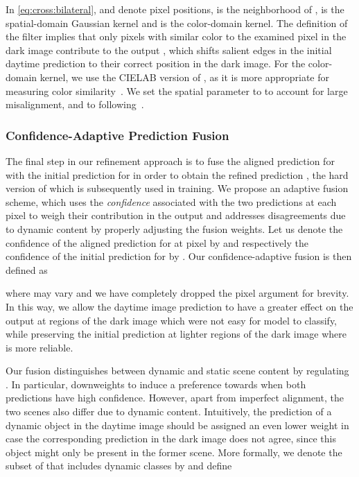 \documentclass[10pt,twocolumn,letterpaper]{article}
\begin{document}
In \eqref{eq:cross:bilateral},  and  denote pixel positions,  is the neighborhood of ,  is the spatial-domain Gaussian kernel and  is the color-domain kernel. The definition of the filter implies that only pixels  with similar color to the examined pixel  in the dark image  contribute to the output , which shifts salient edges in the initial daytime prediction to their correct position in the dark image. For the color-domain kernel, we use the CIELAB version of , as it is more appropriate for measuring color similarity~\cite{bilateral:grid}. We set the spatial parameter  to  to account for large misalignment, and  to  following~\cite{bilateral:grid,SynRealDataFogECCV18}.

\subsubsection{Confidence-Adaptive Prediction Fusion}
\label{sec:gcma:guidance:fusion}

The final step in our refinement approach is to fuse the aligned prediction  for  with the initial prediction  for  in order to obtain the refined prediction , the hard version of which is subsequently used in training. We propose an adaptive fusion scheme, which uses the \emph{confidence} associated with the two predictions at each pixel to weigh their contribution in the output and addresses disagreements due to dynamic content by properly adjusting the fusion weights. Let us denote the confidence of the aligned prediction  for  at pixel  by  and respectively the confidence of the initial prediction  for  by . Our confidence-adaptive fusion is then defined as

where  may vary and we have completely dropped the pixel argument  for brevity. In this way, we allow the daytime image prediction to have a greater effect on the output at regions of the dark image which were not easy for model  to classify, while preserving the initial prediction  at lighter regions of the dark image where  is more reliable.

Our fusion distinguishes between dynamic and static scene content by regulating . In particular,  downweights  to induce a preference towards  when both predictions have high confidence. However, apart from imperfect alignment, the two scenes also differ due to dynamic content. Intuitively, the prediction of a dynamic object in the daytime image should be assigned an even lower weight in case the corresponding prediction in the dark image does not agree, since this object might only be present in the former scene. More formally, we denote the subset of  that includes dynamic classes by  and define
\end{document}

